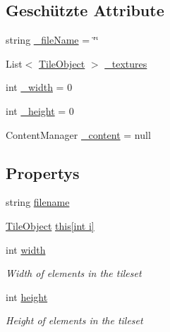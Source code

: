 \subsection*{Geschützte Attribute}
\begin{DoxyCompactItemize}
\item 
string \hyperlink{class_gruppe22_1_1_client_1_1_tile_set_a8dcf979a6db589877617e61d8cf83c00}{\-\_\-file\-Name} = \char`\"{}\char`\"{}
\item 
List$<$ \hyperlink{class_gruppe22_1_1_client_1_1_tile_object}{Tile\-Object} $>$ \hyperlink{class_gruppe22_1_1_client_1_1_tile_set_a332828d2999a514c32a3c24d2d7d48f6}{\-\_\-textures}
\item 
int \hyperlink{class_gruppe22_1_1_client_1_1_tile_set_a4e36d9c553edb1cee5cf05bea5740d84}{\-\_\-width} = 0
\item 
int \hyperlink{class_gruppe22_1_1_client_1_1_tile_set_aa46be5438fd81b9c53c872896a841ef8}{\-\_\-height} = 0
\item 
Content\-Manager \hyperlink{class_gruppe22_1_1_client_1_1_tile_set_af9c1d1df067b48ed6701e75295377044}{\-\_\-content} = null
\end{DoxyCompactItemize}
\subsection*{Propertys}
\begin{DoxyCompactItemize}
\item 
string \hyperlink{class_gruppe22_1_1_client_1_1_tile_set_afce49a3941b2d4a360990f9847282da1}{filename}
\item 
\hyperlink{class_gruppe22_1_1_client_1_1_tile_object}{Tile\-Object} \hyperlink{class_gruppe22_1_1_client_1_1_tile_set_a5182218935ec1904b9160d37b8ece9c2}{this\mbox{[}int i\mbox{]}}
\item 
int \hyperlink{class_gruppe22_1_1_client_1_1_tile_set_aff0371f9e4071f24de16612c2066ad5b}{width}
\begin{DoxyCompactList}\small\item\em Width of elements in the tileset \end{DoxyCompactList}\item 
int \hyperlink{class_gruppe22_1_1_client_1_1_tile_set_a12343c861014c3631e1a40dfeef20312}{height}
\begin{DoxyCompactList}\small\item\em Height of elements in the tileset \end{DoxyCompactList}\end{DoxyCompactItemize}


